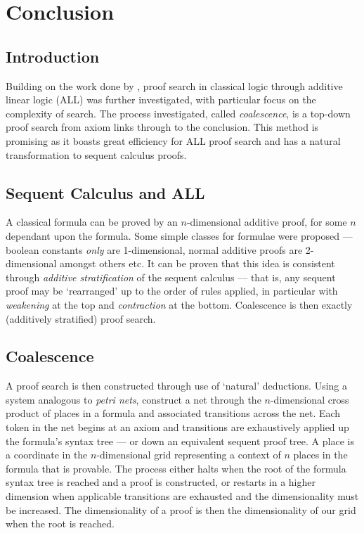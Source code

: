 \chapter{Conclusion}
    
        
    \section*{Introduction}
        Building on the work done by \citet{petri-nets}, proof search in classical logic through additive linear logic (ALL) was further investigated, with particular focus on the complexity of search.
        The process investigated, called \textit{coalescence}, is a top-down proof search from axiom links through to the conclusion.
        This method is promising as it boasts great efficiency for ALL proof search and has a natural transformation to sequent calculus proofs.

    \section*{Sequent Calculus and ALL}
        A classical formula can be proved by an $n$-dimensional additive proof, for some $n$ dependant upon the formula.
        Some simple classes for formulae were proposed --- boolean constants \textit{only} are 1-dimensional, normal additive proofs are 2-dimensional amongst others etc.
        It can be proven that this idea is consistent through \textit{additive stratification} of the sequent calculus --- that is, any sequent proof may be `rearranged' up to the order of rules applied, in particular with \textit{weakening} at the top and \textit{contraction} at the bottom.
        Coalescence is then exactly (additively stratified) proof search.

    \section*{Coalescence}
        A proof search is then constructed through use of `natural' deductions.
        Using a system analogous to \textit{petri nets}, construct a net through the $n$-dimensional cross product of places in a formula and associated transitions across the net.
        Each token in the net begins at an axiom and transitions are exhaustively applied up the formula's syntax tree --- or down an equivalent sequent proof tree.
        A place is a coordinate in the $n$-dimensional grid representing a context of $n$ places in the formula that is provable.
        The process either halts when the root of the formula syntax tree is reached and a proof is constructed, or restarts in a higher dimension when applicable transitions are exhausted and the dimensionality must be increased.
        The dimensionality of a proof is then the dimensionality of our grid when the root is reached.

